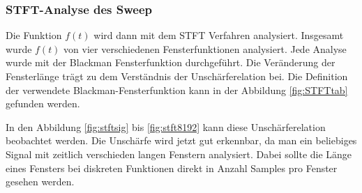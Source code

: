 \subsubsection{STFT-Analyse des Sweep}
Die Funktion $f(t)$  wird dann mit dem STFT Verfahren analysiert. Insgesamt wurde $f(t)$ von vier verschiedenen Fensterfunktionen analysiert. Jede Analyse wurde mit der Blackman Fensterfunktion durchgeführt. Die Veränderung der Fensterlänge trägt zu dem Verständnis der Unschärferelation bei. Die Definition der verwendete Blackman-Fensterfunktion kann in der Abbildung \ref{fig:STFTtab} gefunden werden.


In den Abbildung \ref{fig:stftsig} bis \ref{fig:stft8192} kann diese Unschärferelation beobachtet werden. Die Unschärfe wird jetzt gut erkennbar, da man ein beliebiges Signal mit zeitlich verschieden langen Fenstern analysiert. Dabei sollte die Länge eines Fensters bei diskreten Funktionen direkt in Anzahl Samples pro Fenster gesehen werden.



